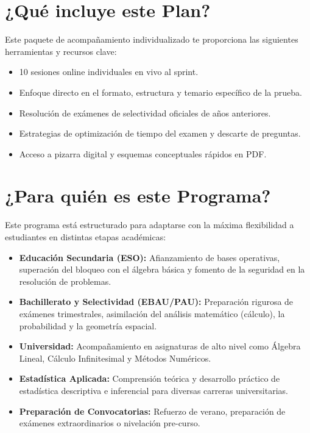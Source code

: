 \documentclass[11pt,a4paper]{article}
\begin{document}
\section{¿Qué incluye este Plan?}
Este paquete de acompañamiento individualizado te proporciona las siguientes herramientas y recursos clave:
\begin{itemize}
    \item 10 sesiones online individuales en vivo al sprint.
    \item Enfoque directo en el formato, estructura y temario específico de la prueba.
    \item Resolución de exámenes de selectividad oficiales de años anteriores.
    \item Estrategias de optimización de tiempo del examen y descarte de preguntas.
    \item Acceso a pizarra digital y esquemas conceptuales rápidos en PDF.
\end{itemize}

\section{¿Para quién es este Programa?}
Este programa está estructurado para adaptarse con la máxima flexibilidad a estudiantes en distintas etapas académicas:
\begin{itemize}
    \item \textbf{Educación Secundaria (ESO):} Afianzamiento de bases operativas, superación del bloqueo con el álgebra básica y fomento de la seguridad en la resolución de problemas.
    \item \textbf{Bachillerato y Selectividad (EBAU/PAU):} Preparación rigurosa de exámenes trimestrales, asimilación del análisis matemático (cálculo), la probabilidad y la geometría espacial.
    \item \textbf{Universidad:} Acompañamiento en asignaturas de alto nivel como Álgebra Lineal, Cálculo Infinitesimal y Métodos Numéricos.
    \item \textbf{Estadística Aplicada:} Comprensión teórica y desarrollo práctico de estadística descriptiva e inferencial para diversas carreras universitarias.
    \item \textbf{Preparación de Convocatorias:} Refuerzo de verano, preparación de exámenes extraordinarios o nivelación pre-curso.
\end{itemize}

\newpage
\end{document}
